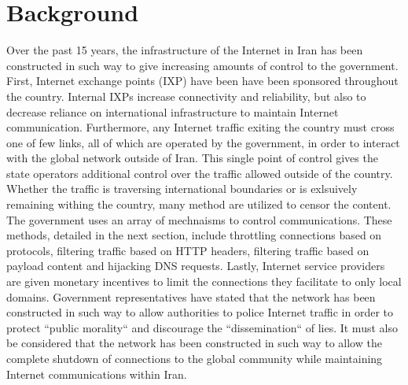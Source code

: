 \section{Background}\label{sec:background}

Over the past 15 years, the infrastructure of the Internet in Iran has been constructed in such way to give increasing amounts of control to the government. First, Internet exchange points (IXP) have been have been sponsored throughout the country. Internal IXPs increase connectivity and reliability, but also to decrease reliance on international infrastructure to maintain Internet communication. Furthermore, any Internet traffic exiting the country must cross one of few links, all of which are operated by the government, in order to interact with the global network outside of Iran. This single point of control gives the state operators additional control over the traffic allowed outside of the country. Whether the traffic is traversing international boundaries or is exlsuively remaining withing the country, many method are utilized to censor the content. The government uses an array of mechnaisms to control communications. These methods, detailed in the next section, include throttling connections based on protocols, filtering traffic based on HTTP headers, filtering traffic based on payload content and hijacking DNS requests. Lastly, Internet service providers are given monetary incentives to limit the connections they facilitate to only local domains. Government representatives have stated that the network has been constructed in such way to allow authorities to police Internet traffic in order to protect ``public morality`` and discourage the ``dissemination`` of lies. It must also be considered that the network has been constructed in such way to allow the complete shutdown of connections to the global community while maintaining Internet communications within Iran.
